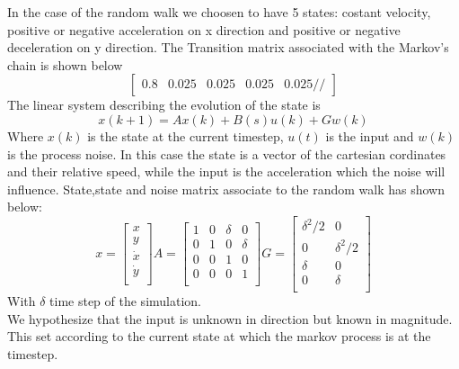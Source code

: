\documentclass{article}
\begin{document}
\begin{multicols}{2}
    In the case of the random walk we choosen to have 5 states: costant velocity, positive or negative acceleration
    on x direction and positive or negative deceleration on y direction. The Transition matrix 
    associated with the Markov's chain is shown below
    \begin{equation*}
        \begin{bmatrix}
            0.8 & 0.025 & 0.025 & 0.025 & 0.025 //
        \end{bmatrix}
    \end{equation*}
    The linear system describing the evolution of the state is 
    \begin{equation}
        x(k+1)= Ax(k) + B(s)u(k) + Gw(k)
    \end{equation}
    Where $x(k)$ is the state at the current timestep, $u(t)$ is the input and $w(k)$ is the process noise.
    In this case the state is a vector of the cartesian cordinates and their relative speed, while the input 
    is the acceleration which the noise will influence. 
    State,state and noise matrix associate to the random walk has shown below:
    \[ x=\begin{bmatrix} x \\ y \\ \dot{x} \\ \dot{y} \\ \end{bmatrix}  A=\begin{bmatrix}
            1 & 0 & \delta & 0      \\
            0 & 1 & 0      & \delta \\
            0 & 0 & 1      & 0      \\
            0 & 0 & 0      & 1      \\
        \end{bmatrix}
        G=\begin{bmatrix}
            \delta^2/2 & 0          \\
            0          & \delta^2/2 \\
            \delta     & 0          \\
            0          & \delta     \\
        \end{bmatrix}
    \]
    With $\delta$ time step of the simulation.
    \\
    We hypothesize that the input is unknown in direction but known in magnitude. This set according to the current state at which the markov process is at the timestep.

\end{multicols}
\end{document}
